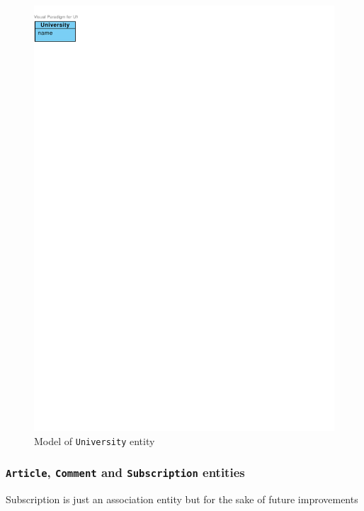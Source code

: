 \begin{figure}[h]
    \centering
        \includegraphics[trim=0 770 510 30, clip, keepaspectratio]{./images/domain-university-entity.pdf}
    \caption{Model of \texttt{University} entity}
    \label{fig:domain-university-entity}
\end{figure}

\subsubsection{\texttt{Article}, \texttt{Comment} and \texttt{Subscription} entities}

Subscription is just an association entity but for the sake of future improvements

\faketext[4]

